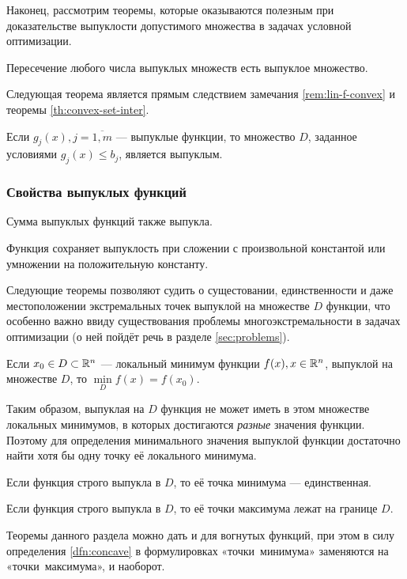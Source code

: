 Наконец, рассмотрим теоремы, которые оказываются полезным при
доказательстве выпуклости допустимого множества в задачах условной
оптимизации.
\begin{thm}
  \label{th:convex-set-inter}
  Пересечение любого числа выпуклых множеств есть выпуклое множество.
\end{thm}
Следующая теорема является прямым следствием замечания
\ref{rem:lin-f-convex} и теоремы \ref{th:convex-set-inter}.
\begin{thm}
  \label{th:convex-set}
  Если $g_j(x), j=\overline{1,m}$ — выпуклые функции, то множество
  $D$, заданное условиями $g_j(x) \leq b_j$, является выпуклым.
\end{thm}

\subsubsection{Свойства выпуклых функций}
\begin{thm}
  \label{th:convex-f-sum}
  Сумма выпуклых функций также выпукла.
\end{thm}

\begin{thm}
  \label{th:convex-f-factor}
  Функция сохраняет выпуклость при сложении с произвольной константой
  или умножении на положительную константу.
\end{thm}

Следующие теоремы позволяют судить о сущестовании, единственности и
даже местоположении экстремальных точек выпуклой на множестве $D$
функции, что особенно важно ввиду существования проблемы
многоэкстремальности в задачах оптимизации (о ней пойдёт речь в
разделе \ref{sec:problems}).

\begin{thm}
  \label{th:convex-f-locmin}
  Если $x_0 \in D \subset \mathbb{R}^n$ — локальный минимум функции
  $f(x), x \in \mathbb{R}^n$, выпуклой на множестве $D$, то
  $\underset{D}{\min}{f(x)} = f(x_0)$.
\end{thm}
Таким образом, выпуклая на $D$ функция не может иметь в этом множестве
локальных минимумов, в которых достигаются \emph{разные} значения
функции. Поэтому для определения минимального значения выпуклой
функции достаточно найти хотя бы одну точку её локального минимума.

\begin{thm}
  \label{th:convex-f-smin}
  Если функция строго выпукла в $D$, то её точка минимума —
  единственная.
\end{thm}

\begin{thm}
  \label{th:convex-f-nomax}
  Если функция строго выпукла в $D$, то её точки максимума лежат на
  границе $D$.
\end{thm}

\begin{rem}
  Теоремы данного раздела можно дать и для вогнутых функций, при этом
  в силу определения \ref{dfn:concave} в формулировках
  «точки минимума» заменяются на «точки максимума», и наоборот.
\end{rem}